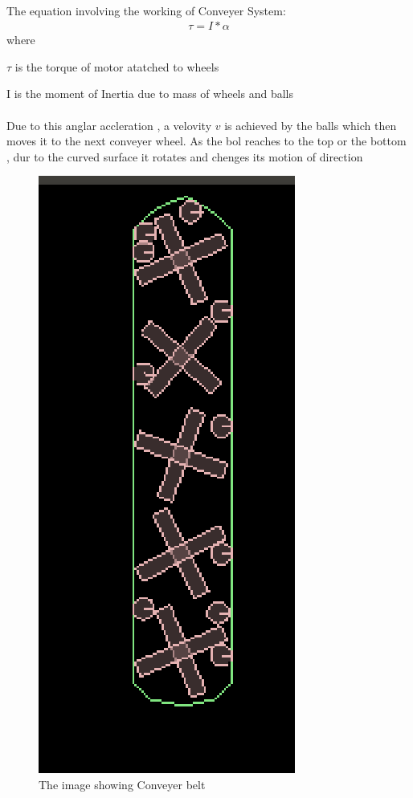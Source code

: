 \documentclass[11pt]{article}
\begin{document}
\paragraph{}
The equation involving the working of Conveyer System:
\begin{eqnarray}
\tau=I*\alpha
\end{eqnarray}
where\par
\begin{description}
  \item $\tau$ is the torque of motor atatched to wheels
  \item I is the moment of Inertia due to mass of wheels and balls
 \end{description}
\paragraph{}
Due to this anglar accleration , a velovity $v$ is achieved by the balls which then moves it to the next conveyer wheel. As the bol reaches to the top or the bottom , dur to the curved surface it rotates and chenges its motion of direction
\begin{figure}[!ht]
    \centering
        \includegraphics[scale=0.6]{img1.eps}
        \caption{\footnotesize{The image showing Conveyer belt}}
    
\end{figure}
\end{document}

